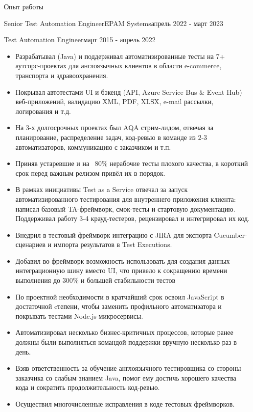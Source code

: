 \documentclass[]{mcdowellcv}
\begin{document}
\raggedright

	\makeheader
	
	\begin{cvsection}{Опыт работы}
		\begin{cvsubsection}{Senior Test Automation Engineer}{EPAM Systems}{апрель 2022 - март 2023}
		\end{cvsubsection}
		\begin{cvsubsection}{Test Automation Engineer}{}{март 2015 - апрель 2022}
			\begin{itemize}
				\item Разрабатывал (Java) и поддерживал автоматизированные тесты на 7+ аутсорс-проектах для англоязычных клиентов в области e-commerce, транспорта и здравоохранения.
				\item Покрывал автотестами UI и бэкенд (API, Azure Service Bus \& Event Hub) веб-приложений, валидацию XML, PDF, XLSX, e-mail рассылки, логирования и т.д.
				\item На 3-х долгосрочных проектах был AQA стрим-лидом, отвечая за планирование, распределение задач, код-ревью в команде из 2-3 автоматизаторов, коммуникацию с заказчиком и т.п.
				\newline
				\item Приняв устаревшие и на ~80\% нерабочие тесты плохого качества, в короткий срок перед важным релизом привёл их в порядок.
				\item В рамках инициативы Test as a Service отвечал за запуск автоматизированного тестирования для внутреннего приложения клиента: написал базовый TA-фреймворк, смок-тесты и стартовую документацию. Поддерживал работу 3-4 крауд-тестеров, рецензировал и интегрировал их код.
				\item Внедрил в тестовый фреймворк интеграцию с JIRA для экспорта Cucumber-сценариев и импорта результатов в Test Executions.
				\item Добавил во фреймворк возможность использовать для создания данных интеграционную шину вместо UI, что привело к сокращению времени выполнения до 300\% и большей стабильности тестов
				\item По проектной необходимости в кратчайший срок освоил JavaScript в достаточной cтепени, чтобы заменить профильного автоматизатора и покрывать тестами Node.js-микросервисы.
				\item Автоматизировал несколько бизнес-критичных процессов, которые ранее должны были выполняться командой поддержки вручную несколько раз в день.
				\item Взяв ответственность за обучение англоязычного тестировщика со стороны заказчика со слабым знанием Java, помог ему достичь хорошего качества кода и сократить продолжительность код-ревью.			
				\item Осуществил многочисленные исправления в коде тестовых фреймворков.
				

\end{itemize}
\end{cvsubsection}
\end{cvsection}
\end{document}
